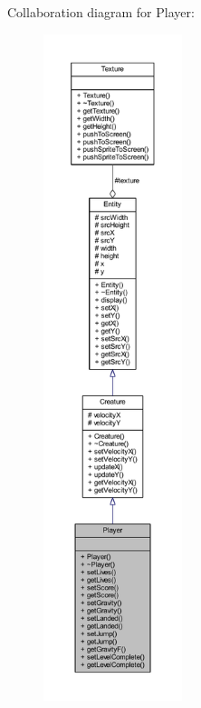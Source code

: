 Collaboration diagram for Player\+:
\nopagebreak
\begin{figure}[H]
\begin{center}
\leavevmode
\includegraphics[height=550pt]{class_player__coll__graph}
\end{center}
\end{figure}
